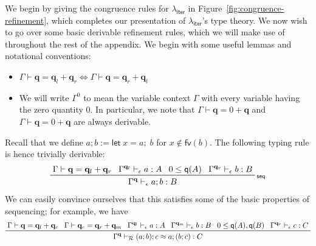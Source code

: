 \documentclass[acmsmall,screen,anonymous,review]{acmart}
\newcommand{\mc}[1]{\ensuremath{\mathcal{#1}}}
\newcommand{\mb}[1]{\ensuremath{\mathbf{#1}}}
\newcommand{\ms}[1]{\ensuremath{\mathsf{#1}}}
\newcommand{\letexpr}[3]{\ensuremath{\ms{let}\;#1 = #2;\;#3}}
\newcommand{\qsp}[4]{#1 \vdash #2 = #3 + #4}
\newcommand{\rle}[1]{{\scriptsize\textsf{#1}}}
\newcommand{\hasty}[4]{#1 \vdash_{#2} #3: {#4}}
\newcommand{\teqv}{\approx}
\newcommand{\tmeq}[5]{#1 \vdash_{#2} #3 \teqv #4 : {#5}}
\newcommand{\subiterexp}{\texorpdfstring{\(\lambda_{\ms{iter}}\)}{lambda-iter}}
\newcommand{\zeroq}{0}
\newcommand{\alquant}{\ms{q}}
\begin{document}
We begin by giving the congruence rules for \subiterexp{} in Figure~\ref{fig:congruence-refinement},
which completes our presentation of \subiterexp{}'s type theory. We now wish to go over some basic
derivable refinement rules, which we will make use of throughout the rest of the appendix. We begin
with some useful lemmas and notational conventions:
\begin{itemize}
  \item $\qsp{\Gamma}{\mb{q}}{\mb{q}_l}{\mb{q}_r} \iff \qsp{\Gamma}{\mb{q}}{\mb{q}_r}{\mb{q}_l}$
  \item We will write $\Gamma^\zeroq$ to mean the variable context $\Gamma$ with every variable
  having the zero quantity $\zeroq$. In particular, we note that $\qsp{\Gamma}{\mb{q}}{0}{\mb{q}}$
  and $\qsp{\Gamma}{\mb{q}}{0}{\mb{q}}$ are always derivable.
\end{itemize}
Recall that we define $a ; b := \letexpr{x}{a}{b}$ for $x \notin \ms{fv}(b)$. The following typing
rule is hence trivially derivable:
\begin{equation*}
  \prftree[r]{\rle{seq}}
    {\qsp{\Gamma}{\mb{q}}{\mb{q}_l}{\mb{q}_r}}
    {\hasty{\Gamma^{\mb{q}_l}}{\epsilon}{a}{A}}
    {0 \leq \alquant(A)}
    {\hasty{\Gamma^{\mb{q}_r}}{\epsilon}{b}{B}}
    {\hasty{\Gamma^{\mb{q}}}{\epsilon}{a ; b}{B}}
\end{equation*}
We can easily convince ourselves that this satisfies some of the basic properties of sequencing; for
example, we have
\begin{equation*}
  \prftree[r]{}
    {\qsp{\Gamma}{\mb{q}}{\mb{q}_l}{\mb{q}_c}}
    {\qsp{\Gamma}{\mb{q}_c}{\mb{q}_r}{\mb{q}_m}}
    {\hasty{\Gamma^{\mb{q}_l}}{\epsilon}{a}{A}}
    {\hasty{\Gamma^{\mb{q}_m}}{\epsilon}{b}{B}}
    {0 \leq \alquant(A), \alquant(B)}
    {\hasty{\Gamma^{\mb{q}_r}}{\epsilon}{c}{C}}
    {\tmeq{\Gamma^{\mb{q}}}{\mc{R}}{(a ; b) ; c}{a ; (b ; c)}{C}}
\end{equation*}
\end{document}
